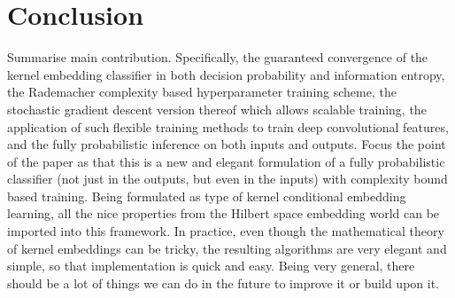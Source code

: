 \documentclass{article}
\newcommand{\note}[1]{{\color{orange} #1}}
\begin{document}
%	

\section{Conclusion}

	\note{Summarise main contribution. Specifically, the guaranteed convergence of the kernel embedding classifier in both decision probability and information entropy, the Rademacher complexity based hyperparameter training scheme, the stochastic gradient descent version thereof which allows scalable training, the application of such flexible training methods to train deep convolutional features, and the fully probabilistic inference on both inputs and outputs. Focus the point of the paper as that this is a new and elegant formulation of a fully probabilistic classifier (not just in the outputs, but even in the inputs) with complexity bound based training. Being formulated as type of kernel conditional embedding learning, all the nice properties from the Hilbert space embedding world can be imported into this framework. In practice, even though the mathematical theory of kernel embeddings can be tricky, the resulting algorithms are very elegant and simple, so that implementation is quick and easy. Being very general, there should be a lot of things we can do in the future to improve it or build upon it.}
	
\end{document}
